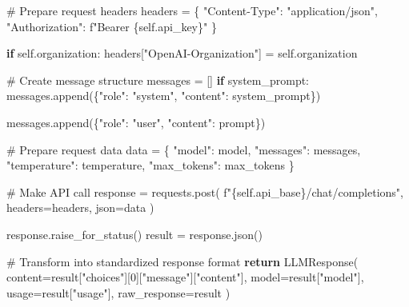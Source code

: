 \documentclass[
  11pt,
  letterpaper,
]{book}
\newenvironment{Shaded}{\begin{snugshade}}{\end{snugshade}}
\newcommand{\CommentTok}[1]{\textcolor[rgb]{0.37,0.37,0.37}{#1}}
\newcommand{\ControlFlowTok}[1]{\textcolor[rgb]{0.00,0.23,0.31}{\textbf{#1}}}
\newcommand{\DecValTok}[1]{\textcolor[rgb]{0.68,0.00,0.00}{#1}}
\newcommand{\NormalTok}[1]{\textcolor[rgb]{0.00,0.23,0.31}{#1}}
\newcommand{\OperatorTok}[1]{\textcolor[rgb]{0.37,0.37,0.37}{#1}}
\newcommand{\SpecialCharTok}[1]{\textcolor[rgb]{0.37,0.37,0.37}{#1}}
\newcommand{\SpecialStringTok}[1]{\textcolor[rgb]{0.13,0.47,0.30}{#1}}
\newcommand{\StringTok}[1]{\textcolor[rgb]{0.13,0.47,0.30}{#1}}
\newcommand{\VariableTok}[1]{\textcolor[rgb]{0.07,0.07,0.07}{#1}}
\begin{document}
\begin{Shaded}
\begin{Highlighting}[]
        \CommentTok{\# Prepare request headers}
\NormalTok{        headers }\OperatorTok{=}\NormalTok{ \{}
            \StringTok{"Content{-}Type"}\NormalTok{: }\StringTok{"application/json"}\NormalTok{,}
            \StringTok{"Authorization"}\NormalTok{: }\SpecialStringTok{f"Bearer }\SpecialCharTok{\{}\VariableTok{self}\SpecialCharTok{.}\NormalTok{api\_key}\SpecialCharTok{\}}\SpecialStringTok{"}
\NormalTok{        \}}

        \ControlFlowTok{if} \VariableTok{self}\NormalTok{.organization:}
\NormalTok{            headers[}\StringTok{"OpenAI{-}Organization"}\NormalTok{] }\OperatorTok{=} \VariableTok{self}\NormalTok{.organization}

        \CommentTok{\# Create message structure}
\NormalTok{        messages }\OperatorTok{=}\NormalTok{ []}
        \ControlFlowTok{if}\NormalTok{ system\_prompt:}
\NormalTok{            messages.append(\{}\StringTok{"role"}\NormalTok{: }\StringTok{"system"}\NormalTok{, }\StringTok{"content"}\NormalTok{: system\_prompt\})}

\NormalTok{        messages.append(\{}\StringTok{"role"}\NormalTok{: }\StringTok{"user"}\NormalTok{, }\StringTok{"content"}\NormalTok{: prompt\})}

        \CommentTok{\# Prepare request data}
\NormalTok{        data }\OperatorTok{=}\NormalTok{ \{}
            \StringTok{"model"}\NormalTok{: model,}
            \StringTok{"messages"}\NormalTok{: messages,}
            \StringTok{"temperature"}\NormalTok{: temperature,}
            \StringTok{"max\_tokens"}\NormalTok{: max\_tokens}
\NormalTok{        \}}

        \CommentTok{\# Make API call}
\NormalTok{        response }\OperatorTok{=}\NormalTok{ requests.post(}
            \SpecialStringTok{f"}\SpecialCharTok{\{}\VariableTok{self}\SpecialCharTok{.}\NormalTok{api\_base}\SpecialCharTok{\}}\SpecialStringTok{/chat/completions"}\NormalTok{,}
\NormalTok{            headers}\OperatorTok{=}\NormalTok{headers,}
\NormalTok{            json}\OperatorTok{=}\NormalTok{data}
\NormalTok{        )}

\NormalTok{        response.raise\_for\_status()}
\NormalTok{        result }\OperatorTok{=}\NormalTok{ response.json()}

        \CommentTok{\# Transform into standardized response format}
        \ControlFlowTok{return}\NormalTok{ LLMResponse(}
\NormalTok{            content}\OperatorTok{=}\NormalTok{result[}\StringTok{"choices"}\NormalTok{][}\DecValTok{0}\NormalTok{][}\StringTok{"message"}\NormalTok{][}\StringTok{"content"}\NormalTok{],}
\NormalTok{            model}\OperatorTok{=}\NormalTok{result[}\StringTok{"model"}\NormalTok{],}
\NormalTok{            usage}\OperatorTok{=}\NormalTok{result[}\StringTok{"usage"}\NormalTok{],}
\NormalTok{            raw\_response}\OperatorTok{=}\NormalTok{result}
\NormalTok{        )}


\end{Highlighting}
\end{Shaded}
\end{document}
